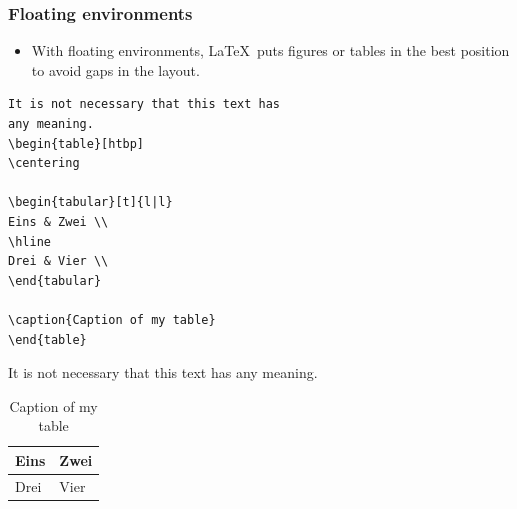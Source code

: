 \begin{frame}[fragile]
\frametitle{Floating environments}

\begin{itemize}
	
	\item With floating environments, \LaTeX\ puts figures or tables in the best position to avoid gaps in the layout. 

\end{itemize}

\begin{multicols}{2}

{\small
\begin{lstlisting}
It is not necessary that this text has 
any meaning.
\begin{table}[htbp]
\centering

\begin{tabular}[t]{l|l}
Eins & Zwei \\
\hline
Drei & Vier \\
\end{tabular}

\caption{Caption of my table}
\end{table}
\end{lstlisting}
}

\columnbreak

It is not necessary that this text has any meaning.
\begin{table}[htbp]
	\centering
	
	\begin{tabular}[t]{l|l}
		Eins & Zwei \\
		\hline
		Drei & Vier \\
	\end{tabular}
	
	\caption{Caption of my table}
\end{table}

\end{multicols}

\end{frame}


